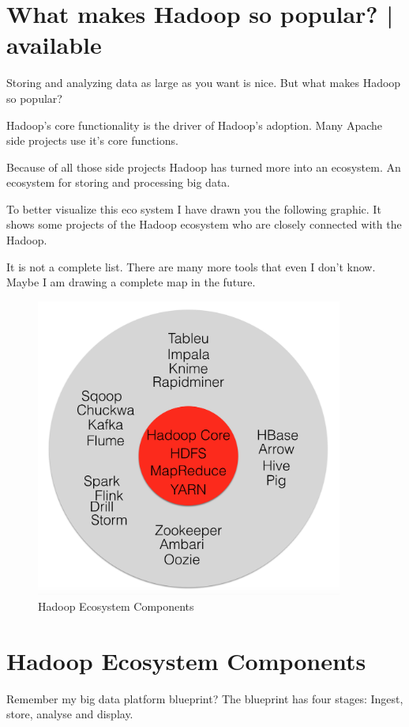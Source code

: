 \documentclass[12pt, numbers=noenddot]{scrreprt} %
\begin{document}
\section{What makes Hadoop so popular? | available}
Storing and analyzing data as large as you want is nice. But what makes Hadoop so popular?

Hadoop’s core functionality is the driver of Hadoop’s adoption. Many Apache side projects use it’s core functions.

Because of all those side projects Hadoop has turned more into an ecosystem. An ecosystem for storing and processing big data.

To better visualize this eco system I have drawn you the following graphic. It shows some projects of the Hadoop ecosystem who are closely connected with the Hadoop.

It is not a complete list. There are many more tools that even I don’t know. Maybe I am drawing a complete map in the future.

\begin{figure}[htbp]
  \centering
     \includegraphics[width=0.9\textwidth]{images/Hadoop-Ecosystem.png}
  \caption{Hadoop Ecosystem Components}
  \label{fig:Bild1}
\end{figure}

\section{Hadoop Ecosystem Components}
Remember my big data platform blueprint? The blueprint has four stages: Ingest, store, analyse and display.
\end{document}
